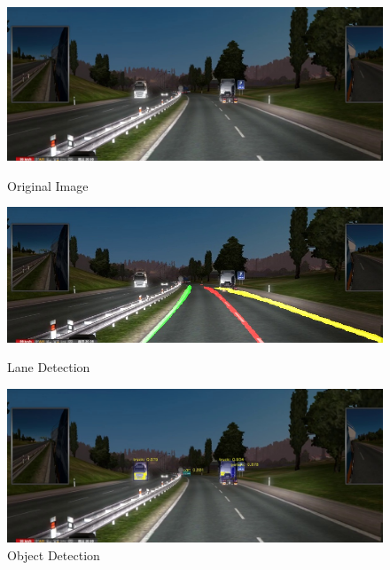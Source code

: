 \documentclass[runningheads]{llncs}
\begin{document}
\begin{figure}[!htb]
	\includegraphics[width=\linewidth]{result/w000131.jpg}
	\caption{Original Image}\label{fig:Original_Image}
	\endminipage\hfill
	\includegraphics[width=\linewidth]{result/w000131-lane.jpg}
	\caption{Lane Detection}\label{fig:Lane_Line_Result}
	\endminipage\hfill
	\includegraphics[width=\linewidth]{result/w000131-obj.jpg}
	\caption{Object Detection}\label{fig:Object_result}
	\endminipage
\end{figure}
\end{document}
